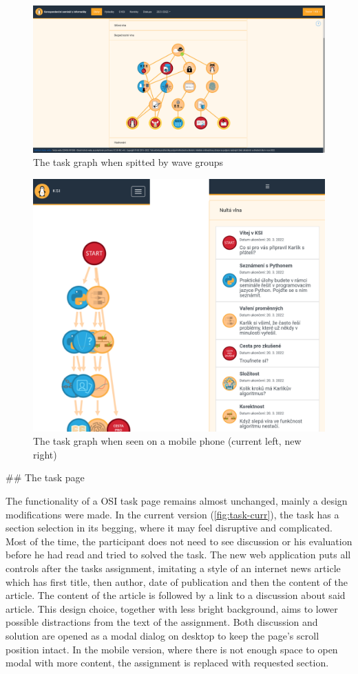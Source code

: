 \documentclass[
  digital, %
  oneside, %
  lof,     %
  lot,     %
]{fithesis4}
\begin{document}
{\begin{figure}
\includegraphics[width=\textwidth]{assets/img/graph_split}
\caption{The task graph when spitted by wave groups}
\label{fig:graph-split}
\end{figure}

\begin{figure}
\includegraphics[width=.5\textwidth]{assets/img/graph-mobile}
\caption{The task graph when seen on a mobile phone (current left, new right)}
\label{fig:graph-mobile}
\end{figure}


## The task page

The functionality of a OSI task page remains almost unchanged, mainly a design modifications were made. In the current version (\ref{fig:task-curr}), the task has a section selection in its begging, where it may feel disruptive and complicated. Most of the time, the participant does not need to see discussion or his evaluation before he had read and tried to solved the task. The new web application puts all controls after the tasks assignment, imitating a style of an internet news article which has first title, then author, date of publication and then the content of the article. The content of the article is followed by a link to a discussion about said article. This design choice, together with less bright background, aims to lower possible distractions from the text of the assignment. Both discussion and solution are opened as a modal dialog on desktop to keep the page's scroll position intact. In the mobile version, where there is not enough space to open modal with more content, the assignment is replaced with requested section.


}
\end{document}
